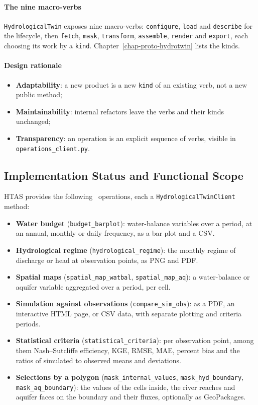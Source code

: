 \paragraph{The nine macro-verbs}

\texttt{HydrologicalTwin} exposes nine macro-verbs: \texttt{configure},
\texttt{load} and \texttt{describe} for the lifecycle, then \texttt{fetch},
\texttt{mask}, \texttt{transform}, \texttt{assemble}, \texttt{render} and
\texttt{export}, each choosing its work by a \texttt{kind}. Chapter~\ref{chap-proto-hydrotwin}
lists the kinds.

\paragraph{Design rationale}

\begin{itemize}
    \item \textbf{Adaptability}: a new product is a new \texttt{kind} of an existing verb, not a new public method;
    \item \textbf{Maintainability}: internal refactors leave the verbs and their kinds unchanged;
    \item \textbf{Transparency}: an operation is an explicit sequence of verbs, visible in \texttt{operations\_client.py}.
\end{itemize}

\subsection{Implementation Status and Functional Scope}

HTAS provides the following \cwv\ operations, each a
\texttt{HydrologicalTwinClient} method:

\begin{itemize}
    \item \textbf{Water budget} (\texttt{budget\_barplot}): water-balance variables over a period, at an annual, monthly or daily frequency, as a bar plot and a CSV.
    \item \textbf{Hydrological regime} (\texttt{hydrological\_regime}): the monthly regime of discharge or head at observation points, as PNG and PDF.
    \item \textbf{Spatial maps} (\texttt{spatial\_map\_watbal}, \texttt{spatial\_map\_aq}): a water-balance or aquifer variable aggregated over a period, per cell.
    \item \textbf{Simulation against observations} (\texttt{compare\_sim\_obs}): as a PDF, an interactive HTML page, or CSV data, with separate plotting and criteria periods.
    \item \textbf{Statistical criteria} (\texttt{statistical\_criteria}): per observation point, among them Nash--Sutcliffe efficiency, KGE, RMSE, MAE, percent bias and the ratios of simulated to observed means and deviations.
    \item \textbf{Selections by a polygon} (\texttt{mask\_internal\_values}, \texttt{mask\_hyd\_boundary}, \texttt{mask\_aq\_boundary}): the values of the cells inside, the river reaches and aquifer faces on the boundary and their fluxes, optionally as GeoPackages.
\end{itemize}


